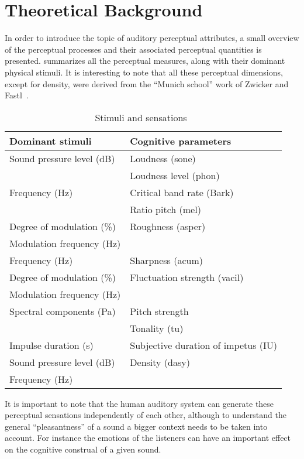 \documentclass[../main.tex]{subfiles}
\begin{document}
\chapter{Theoretical Background}

In order to introduce the topic of auditory perceptual attributes, a small
overview of the perceptual processes and their associated perceptual quantities
is presented.  summarizes all the perceptual measures, along
with their dominant physical stimuli. It is interesting to note that all these
perceptual dimensions, except for density, were derived from the
``Munich school'' work of Zwicker and Fastl~\cite{Fastl2007Psychoacoustics}.

\begin{table}[ht]
  \centering
  \begin{tabu}{ l l }
    \toprule
    \rowfont\bfseries
    Dominant stimuli & Cognitive parameters \\
    \midrule
    Sound pressure level (dB) & Loudness (sone) \\
    & Loudness level (phon) \\
    \midrule
    Frequency (Hz) & Critical band rate (Bark) \\
    & Ratio pitch (mel) \\
    \midrule
    Degree of modulation (\%) & Roughness (asper)\\
    Modulation frequency (Hz) & \\
    \midrule
    Frequency (Hz) & Sharpness (acum) \\
    \midrule
    Degree of modulation (\%) & Fluctuation strength (vacil) \\
    Modulation frequency (Hz) & \\
    \midrule
    Spectral components (Pa) & Pitch strength \\
    & Tonality (tu) \\
    \midrule
    Impulse duration (s) & Subjective duration of impetus (IU) \\
    \midrule
    Sound pressure level (dB) & Density (dasy) \\
    Frequency (Hz) & \\
    \bottomrule
  \end{tabu}
  \caption{Stimuli and sensations~\cite[pp.~70]{Mueller2012Handbook}}
  \label{tab:stimsens}
\end{table}

It is important to note that the human auditory system can generate these
perceptual sensations independently of each other, although to understand the
general ``pleasantness'' of a sound a bigger context needs to be taken into
account. For instance the emotions of the listeners can have an important
effect on the cognitive construal of a given sound.
\end{document}
